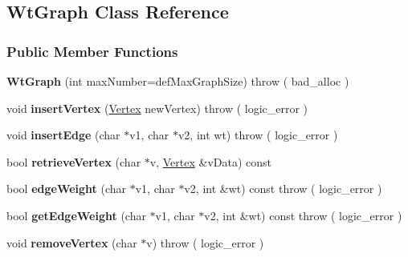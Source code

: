 \hypertarget{class_wt_graph}{}\subsection{Wt\+Graph Class Reference}
\label{class_wt_graph}
\subsubsection*{Public Member Functions}
\begin{DoxyCompactItemize}
\item 
{\bfseries Wt\+Graph} (int max\+Number=def\+Max\+Graph\+Size)  throw ( bad\+\_\+alloc )\hypertarget{class_wt_graph_a24922964bd1ddc86cef3ae0cc42d388d}{}\label{class_wt_graph_a24922964bd1ddc86cef3ae0cc42d388d}

\item 
void {\bfseries insert\+Vertex} (\hyperlink{class_vertex}{Vertex} new\+Vertex)  throw ( logic\+\_\+error )\hypertarget{class_wt_graph_a4ca3eb343548c81ca24fef7de7536437}{}\label{class_wt_graph_a4ca3eb343548c81ca24fef7de7536437}

\item 
void {\bfseries insert\+Edge} (char $\ast$v1, char $\ast$v2, int wt)  throw ( logic\+\_\+error )\hypertarget{class_wt_graph_aea0e33832423083bd5d532dc04ca1dff}{}\label{class_wt_graph_aea0e33832423083bd5d532dc04ca1dff}

\item 
bool {\bfseries retrieve\+Vertex} (char $\ast$v, \hyperlink{class_vertex}{Vertex} \&v\+Data) const \hypertarget{class_wt_graph_aee1b743d73b67a832e30c8603c9f2a0e}{}\label{class_wt_graph_aee1b743d73b67a832e30c8603c9f2a0e}

\item 
bool {\bfseries edge\+Weight} (char $\ast$v1, char $\ast$v2, int \&wt) const   throw ( logic\+\_\+error )\hypertarget{class_wt_graph_ac20ca5b112adb5403f50caf99e4ee8bd}{}\label{class_wt_graph_ac20ca5b112adb5403f50caf99e4ee8bd}

\item 
bool {\bfseries get\+Edge\+Weight} (char $\ast$v1, char $\ast$v2, int \&wt) const   throw ( logic\+\_\+error )\hypertarget{class_wt_graph_afa768b2bfd49e68c1970e479cab00036}{}\label{class_wt_graph_afa768b2bfd49e68c1970e479cab00036}

\item 
void {\bfseries remove\+Vertex} (char $\ast$v)  throw ( logic\+\_\+error )\hypertarget{class_wt_graph_aaabd4ba894d1c4251479837b1d0a0a78}{}\label{class_wt_graph_aaabd4ba894d1c4251479837b1d0a0a78}


\end{DoxyCompactItemize}

